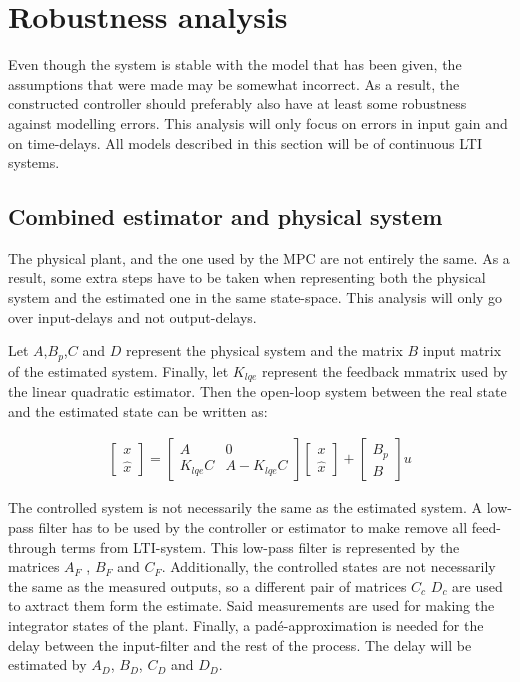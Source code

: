 \section{Robustness analysis}

Even though the system is stable with the model that has been given, the assumptions that were made may be somewhat incorrect. As a result, the constructed controller should preferably also have at least some robustness against modelling errors. This analysis will only focus on errors in input gain and on time-delays. All models described in this section will be of continuous LTI systems. 


\subsection{Combined estimator and physical system}

The physical plant, and the one used by the MPC are not entirely the same. As a result, some extra steps have to be taken when representing both the physical system and the estimated one in the same state-space. This analysis will only go over input-delays and not output-delays. 


\noindent
Let $A$,$B_p$,$C$ and $D$ represent the physical system and the matrix $B$ input matrix of the estimated system. Finally, let $K_{lqe}$ represent the feedback mmatrix used by the linear quadratic estimator.  Then the open-loop system between the real state and the estimated state can be written as:

\begin{align}
    \begin{bmatrix}
        x\\
        \hat{x}
    \end{bmatrix}
    = 
    \begin{bmatrix}
        A & 0 \\
        K_{lqe} C & A - K_{lqe} C
    \end{bmatrix}
    \begin{bmatrix}
        x\\
        \hat{x}
    \end{bmatrix}
    + 
    \begin{bmatrix}
        B_p\\
        B
    \end{bmatrix}
    u
\end{align}

The controlled system is not necessarily the same as the estimated system. A low-pass filter has to be used by the controller or estimator to make remove all feed-through terms from LTI-system. This low-pass filter is represented by the matrices $A_F$ , $B_F$ and $C_F$. Additionally, the controlled states are not necessarily the same as the measured outputs, so a different pair of matrices $C_c$ $D_c$ are used to axtract them form the estimate. Said measurements are used for making the integrator states of the plant. Finally, a padé-approximation is needed for the delay between the input-filter and the rest of the process. The delay will be estimated by $A_D$, $B_D$, $C_D$ and $D_D$. 

